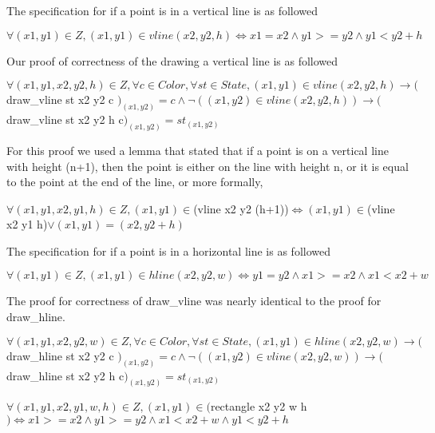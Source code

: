 \documentclass{llncs}
\begin{document}
The specification for if a point is in a vertical line is as followed

\begin {definition} [on\_vline]
$\forall (x1,y1) \in Z, (x1,y1) \in vline (x2,y2,h) \iff x1 = x2 \land y1 >= y2 \land y1 < y2 + h$
\end {definition}

Our proof of correctness of the drawing a vertical line is as followed

\begin {theorem} 
$\forall (x1,y1,x2,y2,h) \in Z, \forall c \in Color,\forall st \in State, (x1,y1) \in vline (x2,y2,h) \rightarrow ($ draw\_vline st x2 y2 c $)_{(x1,y2)} = c \land \neg ((x1,y2) \in vline (x2,y2,h)) \rightarrow ($draw\_vline st x2 y2 h c$)_{(x1,y2)} = st_{(x1,y2)} $
\end {theorem}

For this proof we used a lemma that stated that if a point is on a vertical line with height (n+1), then the point is either on the line with height n, or it is equal to the point at the end of the line, or more formally,

\begin {lemma} 
$\forall (x1,y1,x2,y1,h) \in Z, (x1,y1) \in $(vline x2 y2 (h+1))$ \iff (x1,y1) \in $(vline x2 y1 h)$ \lor (x1,y1)=(x2,y2+h)$
\end {lemma}


The specification for if a point is in a horizontal line is as followed

\begin {definition} [on\_hline]
$\forall (x1,y1) \in Z, (x1,y1) \in hline (x2,y2,w) \iff y1 = y2 \land x1 >= x2 \land x1 < x2 + w$
\end {definition}

The proof for correctness of draw\_vline was nearly identical to the proof for draw\_hline.
\begin {theorem} 
$\forall (x1,y1,x2,y2,w) \in Z, \forall c \in Color,\forall st \in State, (x1,y1) \in hline (x2,y2,w) \rightarrow ($ draw\_hline st x2 y2 c $)_{(x1,y2)} = c \land \neg ((x1,y2) \in vline (x2,y2,w)) \rightarrow ($draw\_hline st x2 y2 h c$)_{(x1,y2)} = st_{(x1,y2)} $
\end {theorem}



\begin {definition}[in\_rectangle]
	$\forall (x1,y1,x2,y1,w,h) \in Z, (x1,y1) \in ($rectangle x2 y2 w h$) \iff x1 >= x2 \land y1>=y2 \land x1 < x2 + w \land y1 < y2 + h $
\end {definition}
\end{document}
